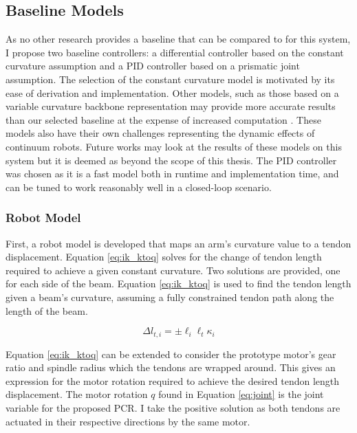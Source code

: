 \subsection{Baseline Models}
\label{sec:baselines}
As no other research provides a baseline that can be compared to for this system, I propose two baseline controllers: a differential controller based on the constant curvature assumption and a PID controller based on a prismatic joint assumption. The selection of the constant curvature model is motivated by its ease of derivation and implementation. Other models, such as those based on a variable curvature backbone representation may provide more accurate results than our selected baseline at the expense of increased computation \cite{10.3389/frobt.2020.630245}. These models also have their own challenges representing the dynamic effects of continuum robots. Future works may look at the results of these models on this system but it is deemed as beyond the scope of this thesis. The PID controller was chosen as it is a fast model both in runtime and implementation time, and can be tuned to work reasonably well in a closed-loop scenario.  

\subsubsection{Robot Model}
First, a robot model is developed that maps an arm's curvature value to a tendon displacement. Equation \eqref{eq:ik_ktoq} solves for the change of tendon length required to achieve a given constant curvature. Two solutions are provided, one for each side of the beam. Equation \eqref{eq:ik_ktoq} is used to find the tendon length given a beam's curvature, assuming a fully constrained tendon path \cite{10.3389/frobt.2020.630245} along the length of the beam. 

\begin{equation}\label{eq:ik_ktoq}
    \Delta l_{t,i} = \pm\ell_i\ell_t\kappa_i
\end{equation}

Equation \eqref{eq:ik_ktoq} can be extended to consider the prototype motor's gear ratio and spindle radius which the tendons are wrapped around. This gives an expression for the motor rotation required to achieve the desired tendon length displacement. The motor rotation $q$ found in Equation \eqref{eq:joint} is the joint variable for the proposed PCR. I take the positive solution as both tendons are actuated in their respective directions by the same motor. 

